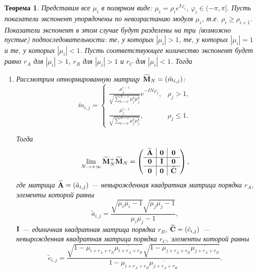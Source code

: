 \documentclass[12pt,a4paper]{article}
\newtheorem{theorem}{Теорема}
\begin{document}
\begin{theorem} \label{th:wninconsistency}
	Представим все $\mu_i$ в полярном виде: $\mu_i = \rho_i e^{I \varphi_i}$, $\varphi_i \in (-\pi, \pi]$. Пусть показатели экспонент упорядочены по невозрастанию модуля $\mu_i$, т.е. $\rho_i \ge \rho_{i+1}$. Показатели экспонент в этом случае будут разделены на три (возможно пустые) подпоследовательности: те, у которых $|\mu_i|>1$, те, у которых $|\mu_i| = 1$ и те, у которых $|\mu_i| < 1$. Пусть соответствующее количество экспонент будет равно $r_A$ для $|\mu_i|>1$, $r_B$ для $|\mu_i|>1$ и $r_C$ для $|\mu_i|<1$. Тогда
	\begin{enumerate}
		\item Рассмотрим отнормированную матрицу $\widetilde {\mathbf{M}}_N = (\tilde m_{i, j})$: 
		\begin{equation*}
		\tilde m_{i, j} = \begin{cases}
		\frac{\mu_j^{i-1}}{\sqrt{\sum_{k=0}^{N-1} \mu_j^k \overline{\mu_j^k}}} e^{-I N \varphi_j}, & \rho_j > 1, \\
		\frac{\mu_j^{i-1}}{\sqrt{\sum_{k=0}^{N-1} \mu_j^k \overline{\mu_j^k}}}, & \rho_j \le 1.
		\end{cases}
		\end{equation*}
		
		Тогда \begin{equation*}
		\lim_{N \to + \infty} \widetilde {\mathbf{M}}_N^+ \widetilde {\mathbf{M}}_N = \left( \begin{array}{c|c|c}
		\widetilde {\mathbf{A}} & \mathbf{0} & \mathbf{0} \\ \hline
		\mathbf{0} & \mathbf{I} & \mathbf{0} \\ \hline
		\mathbf{0} & \mathbf{0} & \widetilde {\mathbf{C}}
		\end{array}  \right),
		\end{equation*}
		где матрица $\widetilde {\mathbf{A}} = (\tilde a_{i, j})$ --- невырожденная квадратная матрица порядка $r_A$, элементы которой равны
		\begin{equation*}
		\tilde a_{i, j} = \frac{\sqrt{\mu_i \overline{\mu_i} - 1}\sqrt{\mu_j \overline{\mu_j} - 1}}{\mu_i \overline{\mu_j} - 1},
		\end{equation*}
		$\mathbf{I}$ --- единичная квадратная матрица порядка $r_B$, $\widetilde {\mathbf{C}} = (\tilde c_{i, j})$ --- невырожденная квадратная матрица порядка $r_C$, элементы которой равны
		\begin{equation*}
		\tilde c_{i, j} = \frac{\sqrt{1 - \mu_{i+r_A+r_B} \overline{\mu_{i+r_A+r_B}}}\sqrt{1 - \mu_{j+r_A+r_B} \overline{\mu_{j+r_A+r_B}}}}{1 - \mu_{i+r_A+r_B} \overline{\mu_{j+r_A+r_B}}}.
	    \end{equation*}
	    

\end{enumerate}
\end{theorem}
\end{document}
